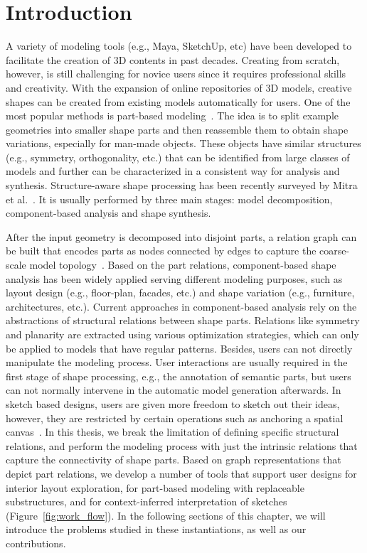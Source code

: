 

\chapter{Introduction}

A variety of modeling tools (e.g., Maya, SketchUp, etc) have been developed to facilitate the creation of 3D contents in past decades. Creating from scratch, however, is still challenging for novice users since it requires professional skills and creativity. With the expansion of online repositories of 3D models, creative shapes can be created from existing models automatically for users. One of the most popular methods is part-based modeling~\cite{Funkhouser2004}. The idea is to split example geometries into smaller shape parts and then reassemble them to obtain shape variations, especially for man-made objects. These objects have similar structures (e.g., symmetry, orthogonality, etc.) that can be identified from large classes of models and further can be characterized in a consistent way for analysis and synthesis. Structure-aware shape processing has been recently surveyed by Mitra et al.~\cite{MitraSTAR2013}. It is usually performed by three main stages: model decomposition, component-based analysis and shape synthesis.

After the input geometry is decomposed into disjoint parts, a relation graph can be built that encodes parts as nodes connected by edges to capture the coarse-scale model topology~\cite{Zheng:2013,topoVarying14}. Based on the part relations, component-based shape analysis has been widely applied serving different modeling purposes, such as layout design (e.g., floor-plan, facades, etc.) and shape variation (e.g., furniture, architectures, etc.). Current approaches in component-based analysis rely on the abstractions of structural relations between shape parts. Relations like symmetry and planarity are extracted using various optimization strategies, which can only be applied to models that have regular patterns. Besides, users can not directly manipulate the modeling process. User interactions are usually required in the first stage of shape processing, e.g., the annotation of semantic parts, but users can not normally intervene in the automatic model generation afterwards. In sketch based designs, users are given more freedom to sketch out their ideas, however, they are restricted by certain operations such as anchoring a spatial canvas~\cite{ilovesketch08}. In this thesis, we break the limitation of defining specific structural relations, and perform the modeling process with just the intrinsic relations that capture the connectivity of shape parts. Based on graph representations that depict part relations, we develop a number of tools that support user designs for interior layout exploration, for part-based modeling with replaceable substructures, and for context-inferred interpretation of sketches (Figure~\ref{fig:work_flow}). In the following sections of this chapter, we will introduce the problems studied in these instantiations, as well as our contributions.

